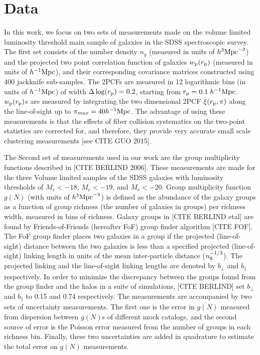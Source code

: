 \documentclass[12pt, preprint]{aastex}
\begin{document}
\section{Data}

In this work, we focus on two sets of measurements made on the volume limited luminosity threshold main sample of galaxies 
in the SDSS spectroscopic survey. The first set consists of the number density $n_{g}$ (measured in units of $h^{3}\rm{Mpc}^{-3}$) 
and the projected two point correlation function of galaxies $w_{\rm{p}}(r_{\rm{p}})$ (measured in units of $h^{-1}\rm{Mpc}$), 
and their corresponding covariance matrices constructed using 400 jackknife sub-samples. 
The 2PCFs are measured in 12 logarithmic bins (in units of $h^{-1}\rm{Mpc}$) of width $\Delta \log(r_{\rm p}) = 0.2$, 
starting from $r_{\rm{p}} = 0.1 \; h^{-1}\rm{Mpc}$. $w_{\rm{p}}(r_{\rm{p}})$s are measured by integrating the two dimensional 
2PCF $\xi(r_{\rm{p}} , \pi)$ along the line-of-sight up to $\pi_{max}=40 h^{-1}\rm{Mpc}$. The advantage of using these measurements 
is that the effects of fiber collision systematics on the two-point statistics are corrected for, and therefore, they provide very 
accurate small scale clustering measurements [see CITE GUO 2015].

The Second set of measurements used in our work are the group multiplicity functions described in [CITE BERLIND 2006]. These measurements are made 
for the three Volume limited samples of the SDSS galaxies with luminosity thresholds of $M_{r}<-18$, $M_{r}<-19$, and $M_{r}<-20$. 
Group multiplicity function $g(N)$ (with units of $h^{3}\rm{Mpc}^{-3}$) is defined as the abundance of the galaxy groups as a 
function of group richness (the number of galaxies in groups) per richness width, measured in bins of richness. 
Galaxy groups in [CITE BERLIND etal] are found by Friends-of-Friends (hereafter FoF) group finder algorithm [CITE FOF]. 
The FoF group finder places two galaxies in a group if the projected (line-of-sight) distance between the two galaxies 
is less than a specified projected (line-of-sight) linking length in units of the mean inter-particle distance ($n_{\rm g}^{-1/3}$).
The projected linking and the line-of-sight linking lengths are denoted by $b_{\perp}$ and $b_{\parallel}$ respectively. 
In order to minimize the discrepancy between the groups found from the group finder and the halos in a suite of simulations, 
[CITE BERLIND] set $b_{\perp}$ and $b_{\parallel}$ to 0.15 and 0.74 respectively.
The measurements are accompanied by two sets of uncertainty measurements. 
The first one is the error in $g(N)$ measured from dispersion between $g(N)$s 
of different mock catalogs, and the second source of error is the Poisson error measured 
from the number of groups in each richness bin. Finally, these two uncertainties are added in quadrature 
to estimate the total error on $g(N)$ measurements.
\end{document}
